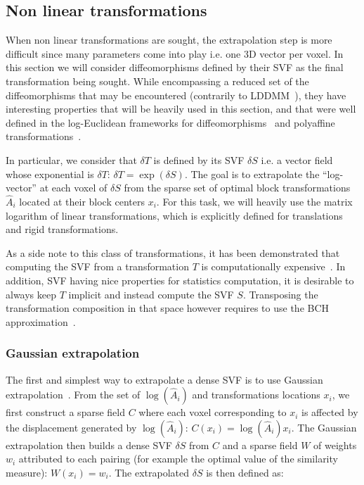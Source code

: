 \documentclass[a4paper]{article}
\begin{document}
\subsection{Non linear transformations}
\label{sub:non-linear-extrapolation}

When non linear transformations are sought, the extrapolation step is more difficult since many parameters come into play i.e. one 3D vector per voxel. In this section we will consider diffeomorphisms defined by their SVF as the final transformation being sought. While encompassing a reduced set of the diffeomorphisms that may be encountered (contrarily to LDDMM~\cite{Beg_IJCV_2005}), they have interesting properties that will be heavily used in this section, and that were well defined in the log-Euclidean frameworks for diffeomorphisms~\cite{arsigny:inria-00615594} and polyaffine transformations~\cite{arsigny:inria-00616084}.

In particular, we consider that $\delta T$ is defined by its SVF $\delta S$ i.e. a vector field whose exponential is $\delta T$: $\delta T = \exp(\delta S)$. The goal is to extrapolate the ``log-vector'' at each voxel of $\delta S$ from the sparse set of optimal block transformations $\hat{A}_i$ located at their block centers $x_i$. For this task, we will heavily use the matrix logarithm of linear transformations, which is explicitly defined for translations and rigid transformations.

As a side note to this class of transformations, it has been demonstrated that computing the SVF from a transformation $T$ is computationally expensive~\cite{arsigny:inria-00615594}. In addition, SVF having nice properties for statistics computation, it is desirable to always keep $T$ implicit and instead compute the SVF $S$. Transposing the transformation composition in that space however requires to use the BCH approximation~\cite{Bossa_Miccai_2007,Vercauteren_Miccai_2008}.

\subsubsection{Gaussian extrapolation} %
\label{ssub:gaussian_extrapolation}

The first and simplest way to extrapolate a dense SVF is to use Gaussian extrapolation~\cite{commowick:tel-00133432,garcia:inria-00616148}. From the set of $\log(\hat{A}_i)$ and transformations locations $x_i$, we first construct a sparse field $C$ where each voxel corresponding to $x_i$ is affected by the displacement generated by $\log(\hat{A}_i)$: $C(x_i) = \log(\hat{A}_i) x_i$. The Gaussian extrapolation then builds a dense SVF $\delta S$ from $C$ and a sparse field $W$ of weights $w_i$ attributed to each pairing (for example the optimal value of the similarity measure): $W(x_i) = w_i$. The extrapolated $\delta S$ is then defined as:
\end{document}
